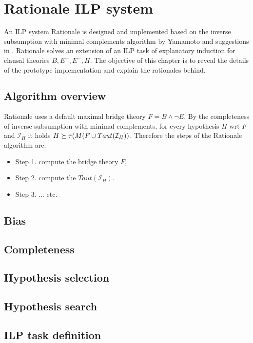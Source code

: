 \chapter{Rationale ILP system}
An ILP system Rationale is designed and implemented based on the inverse subsumption with minimal complements algorithm  by Yamamoto\cite{yamamoto2012inverse} and suggestions in . Rationale solves an extension of an ILP task of explanatory induction for clausal theories $B, E^+, E^-, H$. The objective of this chapter is to reveal the details of the prototype implementation and explain the rationales behind.

\section{Algorithm overview}
Rationale uses a default maximal bridge theory $F=B \land \neg{E}$. By the completeness of inverse subsumption with minimal complements, for every hypothesis $H$ wrt $F$ and $\mathcal{I}_H$ it holds $H \succeq \tau(M(F \cup Taut(\mathcal{I}_H))$. Therefore the steps of the Rationale algorithm are:
\begin{itemize}
\item Step 1. compute the bridge theory $F$,
\item Step 2. compute the $Taut(\mathcal{I}_H)$.
\item Step 3. ... etc.
\end{itemize}

\section{Bias}

\section{Completeness}

\section{Hypothesis selection}

\section{Hypothesis search}

\section{ILP task definition}

